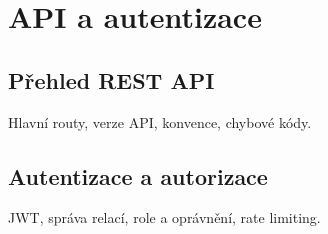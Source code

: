 \chapter{API a autentizace}
\label{chap:api-auth}

\section{Přehled REST API}
Hlavní routy, verze API, konvence, chybové kódy.

\section{Autentizace a autorizace}
JWT, správa relací, role a oprávnění, rate limiting.
